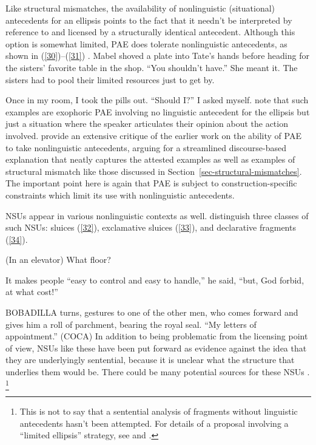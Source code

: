 Like structural mismatches, the availability of nonlinguistic (situational) antecedents for an ellipsis points to the fact that it needn't be interpreted by reference to and licensed by a structurally identical antecedent. Although this option is somewhat limited, PAE does tolerate nonlinguistic antecedents, as shown in (\ref{30})--(\ref{31}) \citep[see also][]{Hankamer1976, Schachter1977}.
\ea Mabel shoved a plate into Tate's hands before heading for the sisters' favorite table in the shop. ``You shouldn't have.'' She meant it. The sisters had to pool their limited resources
just to get by. \citep[ex.\ 23]{Miller2014b}\label{30}\z

\ea Once in my room, I took the pills out. ``Should I?'' I asked myself. \citep[ex.\ 22a]{Miller2014b}\label{31}\z
%
\citet{Miller2014b} note that such examples are exophoric PAE
involving no linguistic antecedent for the ellipsis but 
just a situation where the speaker articulates their opinion about the action involved. \citet{Miller2014b} provide an extensive critique of the earlier work on the ability of PAE to take nonlinguistic antecedents, arguing for a streamlined discourse-based explanation that neatly captures the attested examples as well as examples of structural mismatch like those discussed in Section~\ref{sec-structural-mismatches}. The important point here is again that PAE is subject to construction-specific constraints which limit its use with nonlinguistic antecedents.

NSUs appear in various nonlinguistic contexts as well. \citet{Ginzburg2018} distinguish three classes of such NSUs: sluices (\ref{32}), exclamative sluices (\ref{33}), and declarative fragments (\ref{34}).

\ea (In an elevator) What floor? \citep[298]{Ginzburg:Sag:2000}\label{32}\z

\ea It makes people ``easy to control and easy to handle,'' he said, ``but, God forbid, at what cost!'' \citep[96]{Ginzburg2018}
\label{33}\z

\ea BOBADILLA turns, gestures to one of the other men, who comes forward and gives him a roll of parchment, bearing the royal seal. ``My letters of appointment.'' (COCA)\label{34}\z
%
In addition to being problematic from the licensing point of view, NSUs like these have been put forward as evidence against the idea that they are underlyingly sentential, because it is unclear what the structure that underlies them would be. There could be many potential sources for
these NSUs 
\citep[see][306]{CJ2005a}. %
\footnote{This is not to say that a sentential analysis of fragments without linguistic antecedents hasn't been attempted. For details of a proposal involving a ``limited ellipsis'' strategy, see \citet{Merchant2005a} and \citet{Merchant2010}.}


